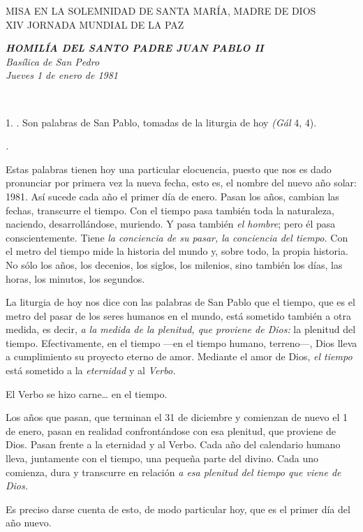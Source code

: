 MISA EN LA SOLEMNIDAD DE SANTA MARÍA, MADRE DE DIOS\\ XIV JORNADA MUNDIAL DE LA PAZ

\emph{\textbf{HOMILÍA DEL SANTO PADRE JUAN PABLO II}\\[2\baselineskip]Basílica de San Pedro\\ Jueves 1 de enero de 1981}

~

1. . Son palabras de San Pablo, tomadas de la liturgia de hoy \emph{(Gál} 4, 4).

\emph{.}

Estas palabras tienen hoy una particular elocuencia, puesto que nos es dado pronunciar por primera vez la nueva fecha, esto es, el nombre del nuevo año solar: 1981. Así sucede cada año el primer día de enero. Pasan los años, cambian las fechas, transcurre el tiempo. Con el tiempo pasa también toda la naturaleza, naciendo, desarrollándose, muriendo. Y pasa también \emph{el hombre}; pero él pasa conscientemente. Tiene \emph{la conciencia de su pasar, la conciencia del tiempo.} Con el metro del tiempo mide la historia del mundo y, sobre todo, la propia historia. No sólo los años, los decenios, los siglos, los milenios, sino también los días, las horas, los minutos, los segundos.

La liturgia de hoy nos dice con las palabras de San Pablo que el tiempo, que es el metro del pasar de los seres humanos en el mundo, está sometido también a otra medida, es decir, \emph{a la medida de la plenitud, que proviene de Dios:} la plenitud del tiempo. Efectivamente, en el tiempo ---en el tiempo humano, terreno---, Dios lleva a cumplimiento su proyecto eterno de amor. Mediante el amor de Dios, \emph{el tiempo} está sometido a la \emph{eternidad} y al \emph{Verbo.}

El Verbo se hizo carne\ldots{} en el tiempo.

Los años que pasan, que terminan el 31 de diciembre y comienzan de nuevo el 1 de enero, pasan en realidad confrontándose con esa plenitud, que proviene de Dios. Pasan frente a la eternidad y al Verbo. Cada año del calendario humano lleva, juntamente con el tiempo, una pequeña parte del  divino. Cada uno comienza, dura y transcurre en relación \emph{a esa plenitud del tiempo que viene de Dios.}

Es preciso darse cuenta de esto, de modo particular hoy, que es el primer día del año nuevo.

